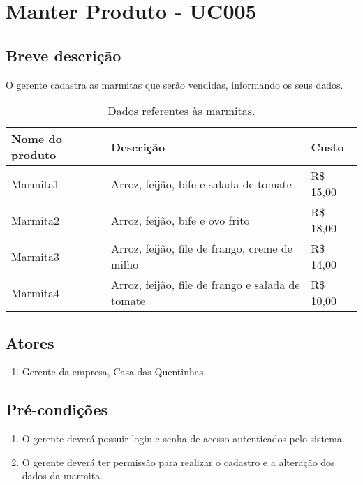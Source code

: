 \chapter{Manter Produto - UC005} \label{uc005}

\section{Breve descrição}

O gerente cadastra as marmitas que serão vendidas, informando os seus dados.

\begin{table}[htb]
	\ABNTEXfontereduzida
	\caption[Dados referentes às marmitas]{Dados referentes às marmitas.}
	\centering
	\label{tab-marmitas}
	\begin{tabular}{|p{4cm}|p{8cm}|p{2cm}|}
		\hline
		\textbf{Nome do produto} & \textbf{Descrição}                               & \textbf{Custo} \\ \hline
		Marmita1                 & Arroz, feijão, bife e salada de tomate           & R\$ 15,00      \\ \hline
		Marmita2                 & Arroz, feijão, bife e ovo frito                  & R\$ 18,00      \\ \hline
		Marmita3                 & Arroz, feijão, file de frango, creme de milho    & R\$ 14,00      \\ \hline
		Marmita4                 & Arroz, feijão, file de frango e salada de tomate & R\$ 10,00      \\ \hline
	\end{tabular}
\end{table}

\section{Atores}

\begin{enumerate}
	\item Gerente da empresa, Casa das Quentinhas.
\end{enumerate}

\section{Pré-condições}

\begin{enumerate}
	\item O gerente deverá possuir login e senha de acesso autenticados pelo sistema.
	\item O gerente deverá ter permissão para realizar o cadastro e a alteração dos dados da marmita.
\end{enumerate}

